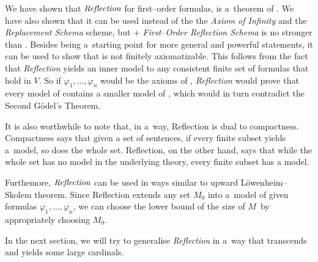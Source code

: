 We have shown that $\emph{Reflection}$ for first–order formulas, is a~theorem of . %
We have also shown that it can be used instead of the the \emph{Axiom of Infinity} and the \emph{Replacement Schema} scheme, but  + \emph{First–Order Reflection Schema} is no stronger than . 
Besides being a~starting point for more general and powerful statements, it can be used to show that  is not finitely axiomatizable. 
This follows from the fact that \emph{Reflection} yields an inner model to any consistent finite set of formulas that hold in $V$.
So if $\varphi_1, \ldots, \varphi_n$ would be the axioms of , \emph{Reflection} would prove that every model of  contains a smaller model of , which would in turn contradict the Second Gödel's Theorem. %

It is also worthwhile to note that, in a~way, Reflection is dual to compactness. 
Compactness says that given a set of sentences, if every finite subset yields a~model, so does the whole set. Reflection, on the other hand, says that while the whole set has no model in the underlying theory, every finite subset has a model.

Furthemore, $\emph{Reflection}$ can be used in ways similar to upward Löwenheim–Skolem theorem.
Since Reflection extends any set $M_0$ into a~model of given formulas $\varphi_1, \ldots, \varphi_n$, we can choose the lower bound of the size of $M$ by appropriately choosing $M_0$.

In the next section, we will try to generalise \emph{Reflection} in a~way that transcends  and yields some large cardinals.
\newpage
